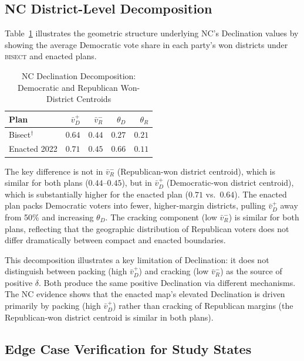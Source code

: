 \subsection{NC District-Level Decomposition}

Table~\ref{tab:decl-nc-decomp} illustrates the geometric structure underlying
NC's Declination values by showing the average Democratic vote share in each
party's won districts under \textsc{bisect} and enacted plans.

\begin{table}[ht]
\centering
\caption{NC Declination Decomposition: Democratic and Republican Won-District Centroids}
\label{tab:decl-nc-decomp}
\begin{tabular}{@{}lrrrr@{}}
\toprule
Plan & $\bar{v}_D^+$ & $\bar{v}_R^-$ & $\theta_D$ & $\theta_R$ \\
\midrule
Bisect$^\dagger$ & $0.64$ & $0.44$ & $0.27$ & $0.21$ \\
Enacted 2022    & $0.71$ & $0.45$ & $0.66$ & $0.11$ \\
\bottomrule
\end{tabular}
\end{table}

The key difference is not in $\bar{v}_R^-$ (Republican-won district centroid), which
is similar for both plans ($0.44$--$0.45$), but in $\bar{v}_D^+$ (Democratic-won
district centroid), which is substantially higher for the enacted plan ($0.71$ vs.\
$0.64$). The enacted plan packs Democratic voters into fewer, higher-margin districts,
pulling $\bar{v}_D^+$ away from 50\% and increasing $\theta_D$. The cracking component
(low $\bar{v}_R^-$) is similar for both plans, reflecting that the geographic distribution
of Republican voters does not differ dramatically between compact and enacted boundaries.

This decomposition illustrates a key limitation of Declination: it does not distinguish
between packing (high $\bar{v}_D^+$) and cracking (low $\bar{v}_R^-$) as the source
of positive $\delta$. Both produce the same positive Declination via different mechanisms.
The NC evidence shows that the enacted map's elevated Declination is driven primarily
by packing (high $\bar{v}_D^+$) rather than cracking of Republican margins (the
Republican-won district centroid is similar in both plans).

\subsection{Edge Case Verification for Study States}

